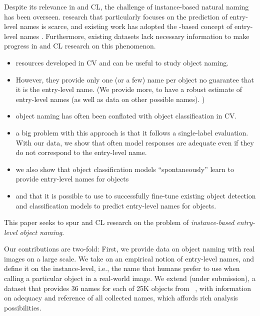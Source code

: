Despite its relevance in \lv and CL, the challenge of instance-based natural naming has been overseen. 
\lv research that particularly focuses on the prediction of entry-level names is scarce, and existing work has adopted the \category-based concept of entry-level names \cite{Ordonez:2016}. 
Furthermore, existing datasets lack necessary information to make progress in \lv and CL research on this phenomenon. 
\begin{itemize}
	\item resources developed in CV and \lv can be useful to study object naming. 
	\item However, they provide only one (or a few) name per object \ra no guarantee that it is the entry-level name. (We provide more, to have a robust estimate of entry-level names (as well as data on other possible names). )
	\item object naming has often been conflated with object classification in CV. 
	\item a big problem with this approach is that it follows a single-label evaluation. With our data, we show that often model responses are adequate even if they do not correspond to the entry-level name.
	\item we also show that object classification models ``spontaneously'' learn to provide entry-level names for objects
	\item and that it is possible to use \mn to successfully fine-tune existing object detection and classification models to predict entry-level names for objects.
\end{itemize}


This paper seeks to spur \lv and CL research on the problem of \textit{instance-based entry-level object naming}. 

Our contributions are two-fold:  
First, we provide data on object naming with real images on a large scale. 
We take on an empirical notion of entry-level names, and define it on the instance-level, i.e., the name that humans prefer to use when calling a particular object in a real-world image.   
We extend \mn (under submission), a dataset that provides 36 names for each of 25K objects from \vg~\cite{+++}, with information on adequacy and reference of all collected names, which affords rich analysis possibilities. 

